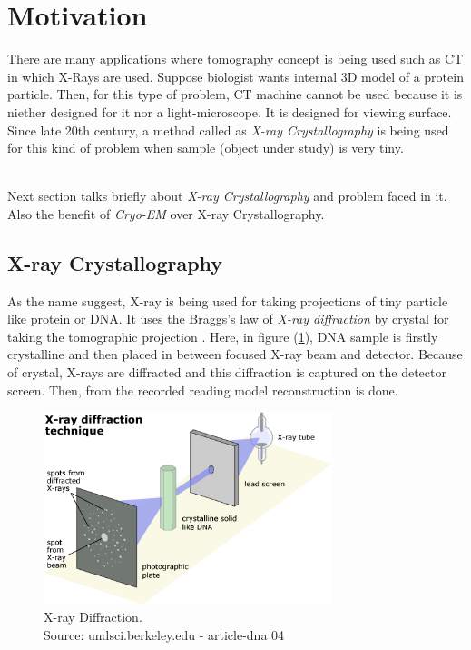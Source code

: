 \documentclass[twoside]{iitbreport}
\begin{document}
\section{Motivation}
There are many applications where tomography concept is being used such as CT in which X-Rays are used. Suppose biologist wants internal 3D model of a protein particle. Then, for this type of problem, CT machine cannot be used because it is niether designed for it nor a light-microscope. It is designed for viewing surface. Since late 20th century, a method called as \textit{X-ray Crystallography} is being used for this kind of problem when sample (object under study) is very tiny\cite{wang2017cryo_crystal}. 

\noindent\\
Next section talks briefly about \textit{X-ray Crystallography} and problem faced in it. Also the benefit of \textit{Cryo-EM} over X-ray Crystallography.

\subsection{X-ray Crystallography}
As the name suggest, X-ray is being used for taking projections of tiny particle like protein or DNA. It uses the Braggs's law of \textit{X-ray diffraction} by crystal for taking the tomographic projection \cite{wang2017cryo_crystal}. Here, in figure (\ref{fig:xray-diffraction}), DNA sample is firstly crystalline and then  placed in between focused X-ray beam and detector. Because of crystal, X-rays are diffracted and this diffraction is captured on the detector screen. Then, from the recorded reading model reconstruction is done.

\begin{figure}[H]
\includegraphics[width=0.75\textwidth]{xraydiffraction}
\centering
\captionsetup{justification=centering}
\caption{ X-ray Diffraction.\\ Source: undsci.berkeley.edu - article-dna 04}
\label{fig:xray-diffraction}
\end{figure}
\end{document}
